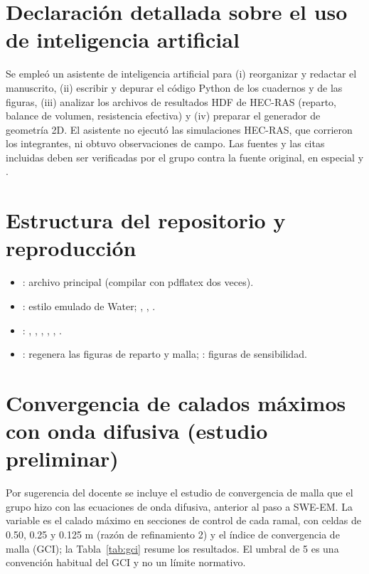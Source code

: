 \appendix
\section{Declaración detallada sobre el uso de inteligencia artificial}\label{anx:ia}
Se empleó un asistente de inteligencia artificial para (i) reorganizar y redactar el manuscrito, (ii) escribir y depurar el código Python de los cuadernos y de las figuras, (iii) analizar los archivos de resultados HDF de HEC-RAS (reparto, balance de volumen, resistencia efectiva) y (iv) preparar el generador de geometría 2D. El asistente no ejecutó las simulaciones HEC-RAS, que corrieron los integrantes, ni obtuvo observaciones de campo. Las fuentes y las citas incluidas deben ser verificadas por el grupo contra la fuente original, en especial \citet{gumgum2025} y \citet{hsu2002}.

\section{Estructura del repositorio y reproducción}
\begin{itemize}
\item {}: archivo principal (compilar con pdflatex dos veces).
\item {}: estilo emulado de Water; , , .
\item {}: , , , , , .
\item {}: regenera las figuras de reparto y malla; : figuras de sensibilidad.
\end{itemize}

\section{Convergencia de calados máximos con onda difusiva (estudio preliminar)}\label{anx:gci}
Por sugerencia del docente se incluye el estudio de convergencia de malla que el grupo hizo con las ecuaciones de onda difusiva, anterior al paso a SWE-EM. La variable es el calado máximo en secciones de control de cada ramal, con celdas de 0.50, 0.25 y 0.125 m (razón de refinamiento 2) y el índice de convergencia de malla (GCI); la Tabla~\ref{tab:gci} resume los resultados. El umbral de 5\pc{} es una convención habitual del GCI y no un límite normativo.

